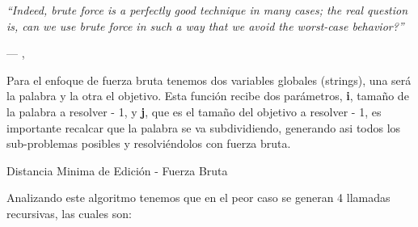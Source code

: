\epigraph{\textit{``Indeed, brute force is a perfectly good technique in many cases; the real question is, can we use brute force in such a way that we avoid the worst-case behavior?''}}{--- \citeauthor{taocv3}, \citeyear{taocv3} \cite{taocv3}}

Para el enfoque de fuerza bruta tenemos dos variables globales (strings), una será la palabra y la otra el objetivo. Esta función recibe dos parámetros, \textbf{i}, tamaño de la palabra a resolver - 1, y \textbf{j}, que es el tamaño del objetivo a resolver - 1, es importante recalcar que la palabra se va subdividiendo, generando asi todos los sub-problemas posibles y resolviéndolos con fuerza bruta.

\begin{algorithm}[H]
    
    \DontPrintSemicolon
    \footnotesize

    \;


    \caption{Distancia Minima de Edición - Fuerza Bruta}
    \label{alg:mi_algoritmo_1}
\end{algorithm}
\vspace{0.5em}
Analizando este algoritmo tenemos que en el peor caso se generan 4 llamadas recursivas, las cuales son:

